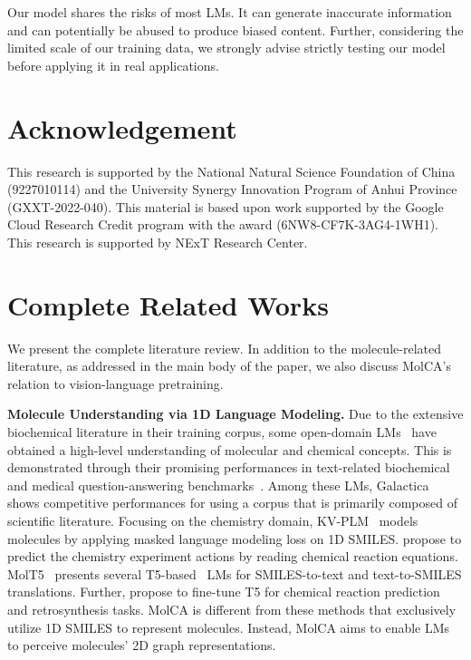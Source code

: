 \documentclass[11pt]{article}
\begin{document}
Our model shares the risks of most LMs. It can generate inaccurate information and can potentially be abused to produce biased content. Further, considering the limited scale of our training data, we strongly advise strictly testing our model before applying it in real applications.

\section*{Acknowledgement}
This research is supported by the National Natural Science Foundation of China (9227010114) and the University Synergy Innovation Program of Anhui Province (GXXT-2022-040). This material is based upon work supported by the Google Cloud Research Credit program with the award (6NW8-CF7K-3AG4-1WH1). This research is supported by NExT Research Center. 


 










\clearpage
\newpage
\appendix


\section{Complete Related Works}
\label{app:related_works}
We present the complete literature review. In addition to the molecule-related literature, as addressed in the main body of the paper, we also discuss MolCA's relation to vision-language pretraining. 


\textbf{Molecule Understanding via 1D Language Modeling.} Due to the extensive biochemical literature in their training corpus, some open-domain LMs~\cite{OPT,LLama,PALM} have obtained a high-level understanding of molecular and chemical concepts. This is demonstrated through their promising performances in text-related biochemical and medical question-answering benchmarks~\cite{MMLU, PubMedQA}. Among these LMs, Galactica~\cite{Galactica} shows competitive performances for using a corpus that is primarily composed of scientific literature. Focusing on the chemistry domain, KV-PLM~\citep{KVPLM} models molecules by applying masked language modeling loss on 1D SMILES. \citet{Smiles2actions} propose to predict the chemistry experiment actions by reading chemical reaction equations. MolT5~\citep{MolT5} presents several T5-based~\cite{T5} LMs for SMILES-to-text and text-to-SMILES translations. Further, \citet{TextChemT5} propose to fine-tune T5 for chemical reaction prediction and retrosynthesis tasks. MolCA is different from these methods that exclusively utilize 1D SMILES to represent molecules. Instead, MolCA aims to enable LMs to perceive molecules' 2D graph representations.
\end{document}

